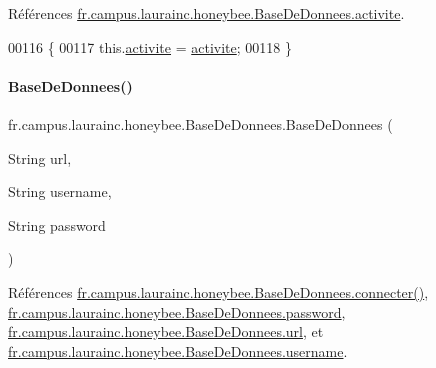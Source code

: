 Références \hyperlink{classfr_1_1campus_1_1laurainc_1_1honeybee_1_1_base_de_donnees_aad4fd29f29916bc4277fa16262d19431}{fr.\+campus.\+laurainc.\+honeybee.\+Base\+De\+Donnees.\+activite}.


\begin{DoxyCode}
00116     \{
00117         this.\hyperlink{classfr_1_1campus_1_1laurainc_1_1honeybee_1_1_base_de_donnees_aad4fd29f29916bc4277fa16262d19431}{activite} = \hyperlink{classfr_1_1campus_1_1laurainc_1_1honeybee_1_1_base_de_donnees_aad4fd29f29916bc4277fa16262d19431}{activite};
00118     \}
\end{DoxyCode}
\mbox{\label{classfr_1_1campus_1_1laurainc_1_1honeybee_1_1_base_de_donnees_a2f6274017a47cc8f331c582f9a7ad6d1}} 
\paragraph{\texorpdfstring{Base\+De\+Donnees()}{BaseDeDonnees()}\hspace{0.1cm}{\footnotesize\ttfamily [3/4]}}
{\footnotesize\ttfamily fr.\+campus.\+laurainc.\+honeybee.\+Base\+De\+Donnees.\+Base\+De\+Donnees (\begin{DoxyParamCaption}\item[{String}]{url,  }\item[{String}]{username,  }\item[{String}]{password }\end{DoxyParamCaption})\hspace{0.3cm}{\ttfamily [private]}}



Références \hyperlink{classfr_1_1campus_1_1laurainc_1_1honeybee_1_1_base_de_donnees_a08564ea7dccde161d6eac4b8879401bb}{fr.\+campus.\+laurainc.\+honeybee.\+Base\+De\+Donnees.\+connecter()}, \hyperlink{classfr_1_1campus_1_1laurainc_1_1honeybee_1_1_base_de_donnees_af1bb604a666a7eee9edd93b6cafaf064}{fr.\+campus.\+laurainc.\+honeybee.\+Base\+De\+Donnees.\+password}, \hyperlink{classfr_1_1campus_1_1laurainc_1_1honeybee_1_1_base_de_donnees_ad1d04b4da375002e91d8370b9d19918e}{fr.\+campus.\+laurainc.\+honeybee.\+Base\+De\+Donnees.\+url}, et \hyperlink{classfr_1_1campus_1_1laurainc_1_1honeybee_1_1_base_de_donnees_a7d1662e10f11f740155774b625ed1a87}{fr.\+campus.\+laurainc.\+honeybee.\+Base\+De\+Donnees.\+username}.


